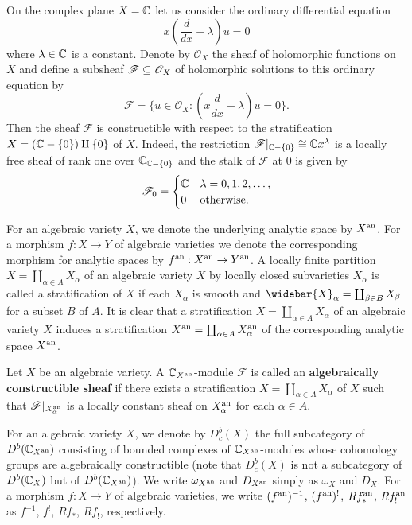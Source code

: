 \begin{example}
On the complex plane $X=\mathbb{C}$ let us consider the ordinary differential equation 
\[x(\frac{d}{dx}-\lambda)u=0\]
where $\lambda\in\mathbb{C}$ is a constant. Denote by $\mathscr{O}_X$ the sheaf of holomorphic functions on $X$ and define a subsheaf $\mathscr{F}\subseteq\mathscr{O}_X$ of holomorphic solutions to this ordinary equation by
\[\mathscr{F}=\{u\in\mathscr{O}_X:(x\frac{d}{dx}-\lambda)u=0\}.\]
Then the sheaf $\mathscr{F}$ is constructible with respect to the stratification $X=(\mathbb{C}-\{0\})\amalg\{0\}$ of $X$. Indeed, the restriction $\mathscr{F}|_{\mathbb{C}-\{0\}}\cong\mathbb{C} x^\lambda$ is a locally free sheaf of rank one over $\mathbb{C}_{\mathbb{C}-\{0\}}$ and the stalk of $\mathscr{F}$ at $0$ is given by
\[\mathscr{F}_0=\begin{cases}
\mathbb{C}&\lambda=0,1,2,\dots,\\
0&\text{otherwise}.
\end{cases}\] 
\end{example}

For an algebraic variety $X$, we denote the underlying analytic space by $X^{\mathrm{an}}$. For a morphism $f:X\to Y$ of algebraic varieties we denote the corresponding morphism for analytic spaces by $f^{\mathrm{an}}:X^{\mathrm{an}}\to Y^{\mathrm{an}}$. A locally finite partition $X=\coprod_{\alpha\in A}X_\alpha$ of an algebraic variety $X$ by locally closed subvarieties $X_\alpha$ is called a stratification of $X$ if each $X_\alpha$ is smooth and $\widebar{X}_\alpha=\coprod_{\beta\in B}X_\beta$ for a subset $B$ of $A$. It is clear that a stratification $X=\coprod_{\alpha\in A}X_\alpha$ of an algebraic variety $X$ induces a stratification $X^{\mathrm{an}}=\coprod_{\alpha\in A}X_\alpha^{\mathrm{an}}$ of the corresponding analytic space $X^{\mathrm{an}}$.

\begin{definition}
Let $X$ be an algebraic variety. A $\mathbb{C}_{X^{\mathrm{an}}}$-module $\mathscr{F}$ is called an \textbf{algebraically constructible sheaf} if there exists a stratification $X=\coprod_{\alpha\in A}X_\alpha$ of $X$ such that $\mathscr{F}|_{X_\alpha^{\mathrm{an}}}$ is a locally constant sheaf on $X_\alpha^{\mathrm{an}}$ for each $\alpha\in A$.
\end{definition}

For an algebraic variety $X$, we denote by $D^b_c(X)$ the full subcategory of $D^b(\mathbb{C}_{X^{\mathrm{an}}})$ consisting of bounded complexes of $\mathbb{C}_{X^{\mathrm{an}}}$-modules whose cohomology groups are algebraically constructible (note that $D^b_c(X)$ is not a subcategory of $D^b(\mathbb{C}_X)$ but of $D^b(\mathbb{C}_{X^{\mathrm{an}}})$). We write $\omega_{X^{\mathrm{an}}}$ and $D_{X^{\mathrm{an}}}$ simply as $\omega_X$ and $D_X$. For a morphism $f:X\to Y$ of algebraic varieties, we write $(f^{\mathrm{an}})^{-1}$, $(f^{\mathrm{an}})^!$, $Rf_*^{\mathrm{an}}$, $Rf_!^{\mathrm{an}}$ as $f^{-1}$, $f^!$, $Rf_*$, $Rf_!$, respectively.

